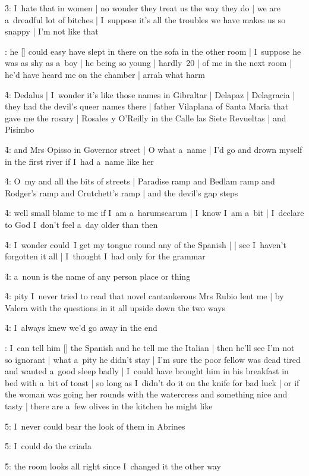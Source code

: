 \f3:
I~hate that in women |
no wonder they treat us the way they do |
we are a~dreadful lot of bitches |
I~suppose it's all the troubles we have makes us so snappy |
I'm not like that

:
he [\stephen] could easy have slept in there on the sofa in the other room |
I~suppose he was as shy as a~boy |
he being so young |
hardly~20 |
of me in the next room |
he'd have heard me on the chamber |
arrah what harm

\f4:
Dedalus |
I~wonder it's like those names in Gibraltar |
Delapaz |
Delagracia |
they had the devil's queer names there |
father Vilaplana of Santa Maria that gave me the rosary |
Rosales y O'Reilly in the Calle las Siete Revueltas |
and Pisimbo

\f4:
and Mrs Opisso in Governor street |
O what a~name |
I'd go and drown myself in the first river if I~had a~name like her

\f4:
O~my and all the bits of streets |
Paradise ramp and Bedlam ramp and Rodger's ramp and Crutchett's ramp |
and the devil's gap steps

\f4:
well small blame to me if I~am a~harumscarum |
I~know I~am a~bit |
I~declare to God I~don't feel a~day older than then

\f4:
I~wonder could~I get my tongue round any of the Spanish |
 |
see I~haven't forgotten it all |
I~thought I~had only for the grammar

\f4:
a~noun is the name of any person place or thing

\f4:
pity I~never tried to read that novel cantankerous Mrs Rubio lent me |
by Valera with the questions in it all upside down the two ways

\f4:
I~always knew we'd go away in the end

:
I~can tell him [\stephen] the Spanish and he tell me the Italian |
then he'll see I'm not so ignorant |
what a~pity he didn't stay |
I'm sure the poor fellow was dead tired and wanted a~good sleep badly |
I~could have brought him in his breakfast in bed with a~bit of toast |
so long as I~didn't do it on the knife for bad luck |
or if the woman was going her rounds with the watercress and something nice and tasty |
there are a~few olives in the kitchen he might like

\f5:
I~never could bear the look of them in Abrines

\f5:
I~could do the criada

\f5:
the room looks all right since I~changed it the other way

